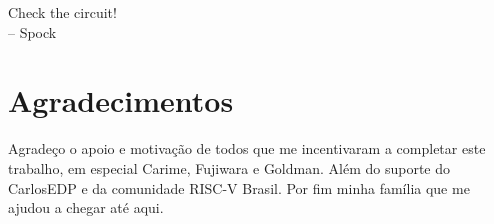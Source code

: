 

\begin{dedicatoria}
    Check the circuit! \\
    – Spock
    \end{dedicatoria}
    
    
    \chapter*{Agradecimentos}
    
    Agradeço o apoio e motivação de todos que me incentivaram a completar 
    este trabalho, em especial Carime, Fujiwara e Goldman. 
    Além do suporte do CarlosEDP e da comunidade RISC-V Brasil.
    Por fim minha família que me ajudou a chegar até aqui.
    
    \printResumoAbstract
    
    
    
    \makeatletter
    \if@openright\cleardoublepage\else\clearpage\fi
    \makeatother
    
    
